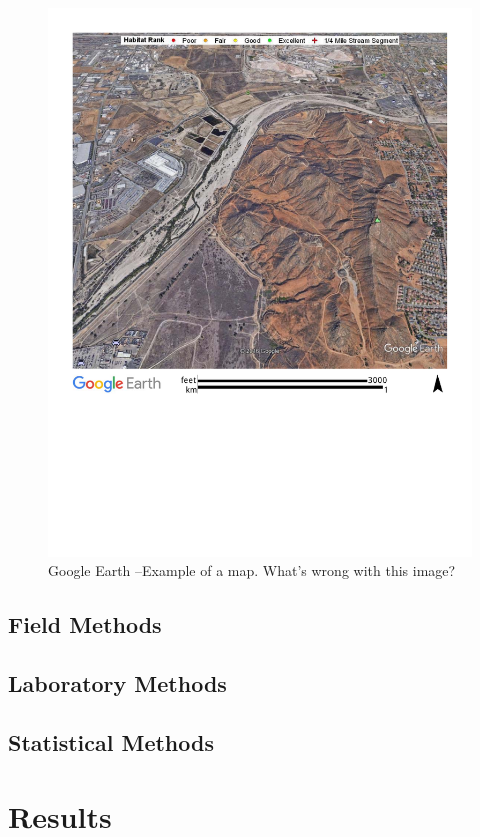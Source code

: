 \documentclass{article}\usepackage[]{graphicx}\usepackage[]{color}
\begin{document}
\begin{figure}
\includegraphics[width=1.00\textwidth]{Figures/SantaAna_SatelliteImage}
\caption{Google Earth --Example of a map. What's wrong with this image?}
\label{SAR_Image}
\end{figure}

\subsection{Field Methods}

\subsection{Laboratory Methods}

\subsection{Statistical Methods}

\section{Results}
\end{document}
